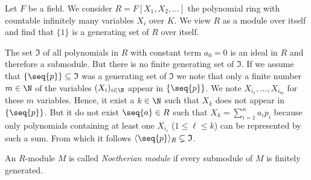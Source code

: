 \begin{exam}
Let $F$ be a field. We consider $R=F[X_1,X_2,\ldots]$ the polynomial ring with countable infinitely many variables $X_i$ over $K$. We view $R$ as a module over itself and find that $\lbrace 1\rbrace$ is a generating set of $R$ over itself.

The set $\mathfrak{I}$ of all polynomials in $R$ with constant term $a_0=0$ is an ideal in $R$ and therefore a submodule. But there is no finite generating set of $\mathfrak{I}$. If we assume that $\lbrace\seq{p}\rbrace\subseteq \mathfrak{I}$ was a generating set of $\mathfrak{I}$ we note that only a finite number $m\in\N$ of the variables $(X_i)_{i\in\N}$ appear in $\lbrace\seq{p}\rbrace$. We note $X_{i_1},\ldots,X_{i_m}$ for these $m$ variables. Hence, it exist a $k\in\N$ such that $X_k$ does not appear in $\lbrace\seq{p}\rbrace$. But it do not exist $\seq{a}\in R$ such that $X_k=\sum_{i=1}^n a_ip_i$ because only polynomials containing at least one $X_{i_\ell}$ ($1\leq\ell\leq k$) can be represented by such a sum. From which it follows $\langle\seq{p}\rangle_R\subsetneq \mathfrak{I}$.
\end{exam}

\begin{defin}
An $R$-module $M$ is called \emph{Noetherian module} if every submodule of $M$ is finitely generated.
\end{defin}


